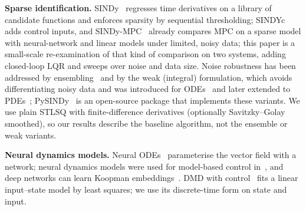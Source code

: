 \textbf{Sparse identification.} SINDy~\cite{brunton2016discovering} regresses time derivatives on a library of candidate functions and enforces sparsity by sequential thresholding; SINDYc~\cite{brunton2016sparse} adds control inputs, and SINDy-MPC~\cite{kaiser2018sparse} already compares MPC on a sparse model with neural-network and linear models under limited, noisy data; this paper is a small-scale re-examination of that kind of comparison on two systems, adding closed-loop LQR and sweeps over noise and data size. Noise robustness has been addressed by ensembling~\cite{fasel2022ensemble} and by the weak (integral) formulation, which avoids differentiating noisy data and was introduced for ODEs~\cite{messenger2020weak} and later extended to PDEs~\cite{messenger2021weak}; PySINDy~\cite{kaptanoglu2022pysindy} is an open-source package that implements these variants. We use plain STLSQ with finite-difference derivatives (optionally Savitzky--Golay smoothed), so our results describe the baseline algorithm, not the ensemble or weak variants.

\textbf{Neural dynamics models.} Neural ODEs~\cite{chen2018neural} parameterise the vector field with a network; neural dynamics models were used for model-based control in~\cite{nagabandi2018neural}, and deep networks can learn Koopman embeddings~\cite{lusch2018deep}. DMD with control~\cite{proctor2016dynamic} fits a linear input--state model by least squares; we use its discrete-time form on state and input.
